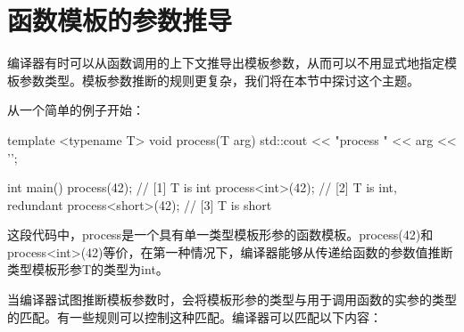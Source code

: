 \section{函数模板的参数推导}
编译器有时可以从函数调用的上下文推导出模板参数，从而可以不用显式地指定模板参数类型。模板参数推断的规则更复杂，我们将在本节中探讨这个主题。

从一个简单的例子开始：

\begin{cppcode}
template <typename T>
void process(T arg)
{
	std::cout << "process " << arg << '\n';
}

int main()
{
	process(42); // [1] T is int
	process<int>(42); // [2] T is int, redundant
	process<short>(42); // [3] T is short
}
\end{cppcode}

这段代码中，process是一个具有单一类型模板形参的函数模板。process(42)和process<int>(42)等价，在第一种情况下，编译器能够从传递给函数的参数值推断类型模板形参T的类型为int。

当编译器试图推断模板参数时，会将模板形参的类型与用于调用函数的实参的类型的匹配。有一些规则可以控制这种匹配。编译器可以匹配以下内容：

